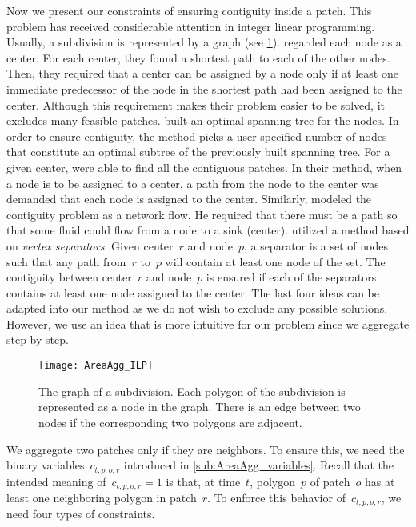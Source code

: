 Now we present our constraints of 
ensuring contiguity inside a patch.
This problem has received considerable attention 
in integer linear programming.
Usually, a subdivision is represented by a graph
(see \fig\ref{fig:AreaAgg_Variables_Graph}).
%
\textcite{Zoltners1983Territory} regarded each node as a center.
For each center, they found a shortest path 
to each of the other nodes.
Then, they required that a center can be assigned 
by a node only if 
at least one immediate predecessor of the node 
in the shortest path had been assigned to the center.
Although this requirement makes 
their problem easier to be solved,
it excludes many feasible patches.
%
\textcite{Williams2002Contiguous} 
built an optimal spanning tree for the nodes.
In order to ensure contiguity, 
the method picks a user-specified number of nodes that constitute 
an optimal subtree of the previously built spanning tree.
%
For a given center, \textcite{Cova2000_Contiguity} 
were able to find all the contiguous patches.
In their method, when a node is to be assigned to a center, 
a path from the node to the center was demanded 
that each node is assigned to the center.
%
Similarly, \textcite{Shirabe2005Contiguity} modeled 
the contiguity problem as a network flow.
He required that there must be a path so that 
some fluid could flow from a node to a sink (center).
%
\textcite{Oehrlein2017Aggregation} utilized a method based 
on \emph{vertex separators}.	
Given center~$r$ and node~$p$, 
a separator is a set of nodes
such that any path from~$r$ to~$p$ 
will contain at least one node of the set.
The contiguity between center~$r$ and node~$p$ is ensured 
if each of the separators contains 
at least one node assigned to the center.
%
The last four ideas can be adapted into our method
as we do not wish to exclude any possible solutions.
However, we use an idea
that is more intuitive for our problem
since we aggregate step by step.


\begin{figure}[tb]
\centering
\texttt{[image: AreaAgg\_ILP]}
\caption{The graph of a subdivision.
	Each polygon of the subdivision is represented as a node 
	in the graph.
	There is an edge between two nodes
	if the corresponding two polygons are adjacent.
}
\label{fig:AreaAgg_Variables_Graph}
\end{figure} 

We aggregate two patches only if they are neighbors.
To ensure this, we need the binary variables~$c_{t,p,o,r}$
introduced in \sect\ref{sub:AreaAgg_variables}.
Recall that the intended meaning of~$c_{t,p,o,r}=1$ 
is that, at time~$t$, 
polygon~$p$ of patch~$o$ has 
at least one neighboring polygon in patch~$r$.
To enforce this behavior of~$c_{t,p,o,r}$, 
we need four types of constraints.

